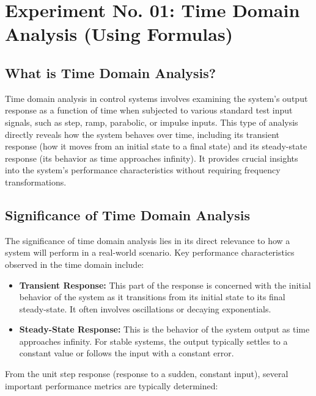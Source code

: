 \documentclass[a4paper,12pt]{article}
\begin{document}
	
	\section*{Experiment No. 01: Time Domain Analysis (Using Formulas)}
	
	\subsection*{What is Time Domain Analysis?}
	
	Time domain analysis in control systems involves examining the system's output response as a function of time when subjected to various standard test input signals, such as step, ramp, parabolic, or impulse inputs. This type of analysis directly reveals how the system behaves over time, including its transient response (how it moves from an initial state to a final state) and its steady-state response (its behavior as time approaches infinity). It provides crucial insights into the system's performance characteristics without requiring frequency transformations.
	
	\subsection*{Significance of Time Domain Analysis}
	
	The significance of time domain analysis lies in its direct relevance to how a system will perform in a real-world scenario. Key performance characteristics observed in the time domain include:
	
	\begin{itemize}
		\item \textbf{Transient Response:} This part of the response is concerned with the initial behavior of the system as it transitions from its initial state to its final steady-state. It often involves oscillations or decaying exponentials.
		\item \textbf{Steady-State Response:} This is the behavior of the system output as time approaches infinity. For stable systems, the output typically settles to a constant value or follows the input with a constant error.
	\end{itemize}
	
	From the unit step response (response to a sudden, constant input), several important performance metrics are typically determined:
	
\end{document}

